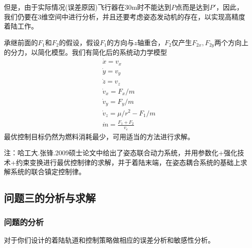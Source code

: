             \par
            但是，由于实际情况(误差原因)飞行器在30m时不能达到$P$点而是达到$P'$，因此，我们仍要在3维空间中进行分析，并且还要考虑姿态发动机的存在，以实现高精度着陆工作。
            \par
            承继前面的$F_1$和$F_2$的假设，假设$F_1$的方向与$z$轴重合，$F_2$仅产生$F_{2x},F_{2y}$两个方向上的分力，以简化模型。我们有简化后的系统动力学模型
            \begin{align*}
            & \dot{x} = v_x\\
            & \dot{y} = v_y\\
            & \dot{z} = v_z\\
            & \dot{v}_x = F_x/m\\
            & \dot{v}_y = F_y/m\\
            & \dot{v}_z = \mu/r^2 - F_1/m\\
            & \dot{m} = \frac{F_1+F_2}{v_e}
            \end{align*}
            最优控制目标仍然为燃料消耗最少，可用适当的方法进行求解。
            \par
            注：哈工大.张锋.2009硕士论文中给出了姿态联合动力系统，并用参数化+强化技术+约束变换进行最优控制律的求解，并于着陆末端，在姿态耦合系统的基础上求解系统的联合镇定控制律。

    \subsection{问题三的分析与求解}
        \subsubsection{问题的分析}
            \par
            对于你们设计的着陆轨道和控制策略做相应的误差分析和敏感性分析。


